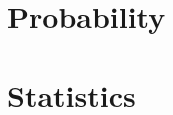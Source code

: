 \documentclass[oneside]{book}
\begin{document}
\pagestyle{fancy}
\renewcommand{\chaptermark}[1]{\markboth{#1}{#1}}
\fancyhead[R]{\thepage}
\fancyhead[L]{\chaptername\ \thechapter\ --\ \leftmark}



\tableofcontents
\part{Probability}





\part{Statistics}
\end{document}
